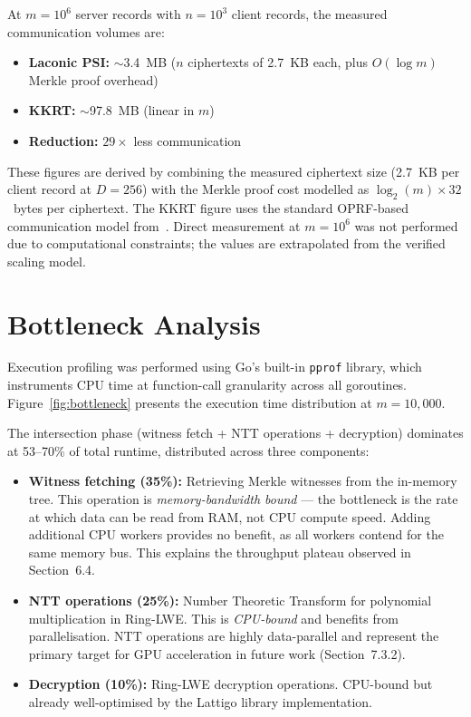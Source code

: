 At $m = 10^6$ server records with $n = 10^3$ client records, the measured communication
volumes are:
\begin{itemize}
    \item \textbf{Laconic PSI:} $\sim$3.4~MB ($n$ ciphertexts of 2.7~KB each, plus $O(\log m)$ Merkle proof overhead)
    \item \textbf{KKRT:} $\sim$97.8~MB (linear in $m$)
    \item \textbf{Reduction:} $29\times$ less communication
\end{itemize}

These figures are derived by combining the measured ciphertext size (2.7~KB per client
record at $D = 256$) with the Merkle proof cost modelled as $\log_2(m) \times 32$~bytes
per ciphertext. The KKRT figure uses the standard OPRF-based communication model from~\cite{kolesnikov2016kkrt}.
Direct measurement at $m = 10^6$ was not performed due to computational constraints;
the values are extrapolated from the verified scaling model.

\section{Bottleneck Analysis}

Execution profiling was performed using Go's built-in \texttt{pprof} library, which
instruments CPU time at function-call granularity across all goroutines. Figure~\ref{fig:bottleneck}
presents the execution time distribution at $m = 10{,}000$.

The intersection phase (witness fetch + NTT operations + decryption) dominates at
53--70\% of total runtime, distributed across three components:

\begin{itemize}
    \item \textbf{Witness fetching (35\%):} Retrieving Merkle witnesses from the in-memory tree.
          This operation is \textit{memory-bandwidth bound} --- the bottleneck is the rate
          at which data can be read from RAM, not CPU compute speed. Adding additional
          CPU workers provides no benefit, as all workers contend for the same memory bus.
          This explains the throughput plateau observed in Section~6.4.
    \item \textbf{NTT operations (25\%):} Number Theoretic Transform for polynomial multiplication
          in Ring-LWE. This is \textit{CPU-bound} and benefits from parallelisation. NTT
          operations are highly data-parallel and represent the primary target for GPU
          acceleration in future work (Section~7.3.2).
    \item \textbf{Decryption (10\%):} Ring-LWE decryption operations. CPU-bound but already
          well-optimised by the Lattigo library implementation.
\end{itemize}

